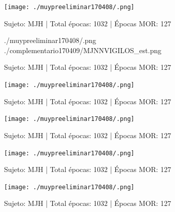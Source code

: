 
\begin{figure}
\centering
\texttt{[image: ./muypreeliminar170408/.png]} 
\caption{Sujeto: MJH | Total \'epocas: 1032 | \'Epocas MOR: 127
}
\label{grf:MFGR}
\end{figure}


\begin{figure}
\centering
{./muypreeliminar170408/.png} 
{./complementario170409/MJNNVIGILOS_est.png} 
\caption{Sujeto: MJH | Total \'epocas: 1032 | \'Epocas MOR: 127
}
\label{grf:CLO}
\end{figure}


\begin{figure}
\centering
\texttt{[image: ./muypreeliminar170408/.png]} 
\caption{Sujeto: MJH | Total \'epocas: 1032 | \'Epocas MOR: 127
}
\label{grf:RLO}
\end{figure}


\begin{figure}
\centering
\texttt{[image: ./muypreeliminar170408/.png]} 
\caption{Sujeto: MJH | Total \'epocas: 1032 | \'Epocas MOR: 127
}
\label{grf:RRU}
\end{figure}


\begin{figure}
\centering
\texttt{[image: ./muypreeliminar170408/.png]} 
\caption{Sujeto: MJH | Total \'epocas: 1032 | \'Epocas MOR: 127
}
\label{grf:JGZ}
\end{figure}


\begin{figure}
\centering
\texttt{[image: ./muypreeliminar170408/.png]} 
\caption{Sujeto: MJH | Total \'epocas: 1032 | \'Epocas MOR: 127
}
\label{grf:FGH}
\end{figure}


